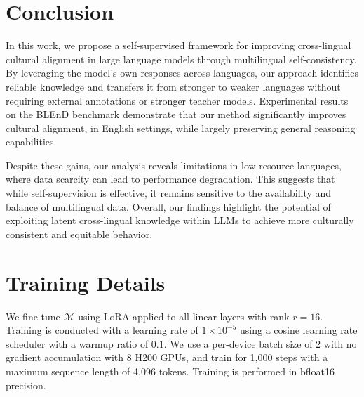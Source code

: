 \documentclass[11pt]{article}
\begin{document}
\section{Conclusion}
In this work, we propose a self-supervised framework for improving cross-lingual cultural alignment in large language models through multilingual self-consistency. By leveraging the model’s own responses across languages, our approach identifies reliable knowledge and transfers it from stronger to weaker languages without requiring external annotations or stronger teacher models. Experimental results on the BLEnD benchmark demonstrate that our method significantly improves cultural alignment, in English settings, while largely preserving general reasoning capabilities. 

Despite these gains, our analysis reveals limitations in low-resource languages, where data scarcity can lead to performance degradation. This suggests that while self-supervision is effective, it remains sensitive to the availability and balance of multilingual data. Overall, our findings highlight the potential of exploiting latent cross-lingual knowledge within LLMs to achieve more culturally consistent and equitable behavior.




\appendix

\section{Training Details}
\label{app:training}
We fine-tune $\mathcal{M}$ using LoRA \cite{hu2022lora} applied to all linear layers with rank $r = 16$. Training is conducted with a learning rate of $1 \times 10^{-5}$ using a cosine learning rate scheduler with a warmup ratio of 0.1. We use a per-device batch size of 2 with no gradient accumulation with 8 H200 GPUs, and train for 1{,}000 steps with a maximum sequence length of 4{,}096 tokens. Training is performed in bfloat16 precision.
\end{document}
